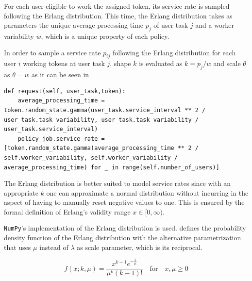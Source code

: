For each user eligible to work the assigned token, its service rate is sampled following the Erlang distribution. This time, the Erlang distribution takes as parameters the unique average processing time $p_j$ of user task $j$ and a worker variability $w$, which is a unique property of each policy.

In order to sample a service rate $p_{ij}$ following the Erlang distribution for each user $i$ working tokens at user task $j$, shape $k$ is evaluated as $k=p_j/w$ and scale $\theta$ as $\theta = w$ as it can be seen in 

\begin{lstlisting}[caption=User service rate sampling following an Erlang distribution,label=lst:user_service_rate,style=CustomPython]
def request(self, user_task,token):
    average_processing_time = token.random_state.gamma(user_task.service_interval ** 2 / user_task.task_variability, user_task.task_variability / user_task.service_interval)
    policy_job.service_rate = [token.random_state.gamma(average_processing_time ** 2 / self.worker_variability, self.worker_variability / average_processing_time) for _ in range(self.number_of_users)]
\end{lstlisting}

The Erlang distribution is better suited to model service rates since with an appropriate $k$ one can approximate a normal distribution without incurring in the aspect of having to manually reset negative values to one. This is ensured by the formal definition of Erlang's validity range $x \in [0,\infty)$.

\texttt{NumPy}'s implementation of the Erlang distribution is used.  defines the probability density function of the Erlang distribution with the alternative parametrization that uses $\mu$ instead of $\lambda$ as scale parameter, which is its reciprocal.

\begin{equation}
\label{eq:erlang_density}
	f(x;k,\mu) = \frac{x^{k-1} e^{-\frac{x}{\mu}}}{\mu^k (k-1)!} \quad \text{for} \quad x,\mu \geq 0
\end{equation}